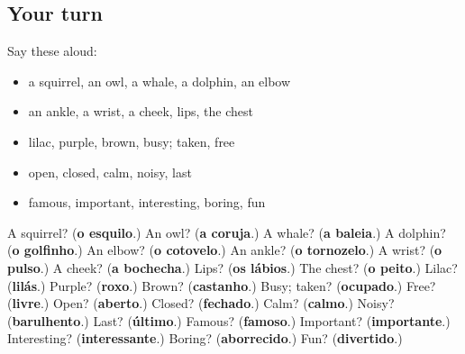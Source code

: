 \subsection*{Your turn}
Say these aloud:

\begin{itemize}
\raggedright
  \item a squirrel, an owl, a whale, a dolphin, an elbow
  \item an ankle, a wrist, a cheek, lips, the chest
  \item lilac, purple, brown, busy; taken, free
  \item open, closed, calm, noisy, last
  \item famous, important, interesting, boring, fun
\end{itemize}

\begin{tcolorbox}[breakable,colback=teal!4,colframe=teal!35!black,title={Before you move on}]
A squirrel? (\textbf{o esquilo}.) An owl? (\textbf{a coruja}.) A whale? (\textbf{a baleia}.) A dolphin? (\textbf{o golfinho}.) An elbow? (\textbf{o cotovelo}.) An ankle? (\textbf{o tornozelo}.) A wrist? (\textbf{o pulso}.) A cheek? (\textbf{a bochecha}.) Lips? (\textbf{os lábios}.) The chest? (\textbf{o peito}.) Lilac? (\textbf{lilás}.) Purple? (\textbf{roxo}.) Brown? (\textbf{castanho}.) Busy; taken? (\textbf{ocupado}.) Free? (\textbf{livre}.) Open? (\textbf{aberto}.) Closed? (\textbf{fechado}.) Calm? (\textbf{calmo}.) Noisy? (\textbf{barulhento}.) Last? (\textbf{último}.) Famous? (\textbf{famoso}.) Important? (\textbf{importante}.) Interesting? (\textbf{interessante}.) Boring? (\textbf{aborrecido}.) Fun? (\textbf{divertido}.)
\end{tcolorbox}
